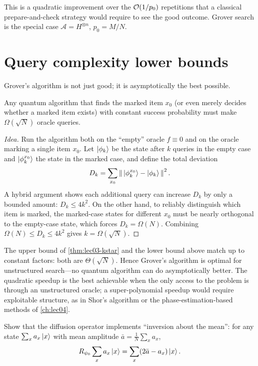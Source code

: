 This is a quadratic improvement over the $\mathcal{O}(1/p_0)$ repetitions that a
classical prepare-and-check strategy would require to see the good outcome. Grover
search is the special case $\mathcal A=H^{\otimes n}$, $p_0=M/N$.

\section{Query complexity lower bounds}
\label{sec:lec03-5}

Grover's algorithm is not just good; it is asymptotically the best possible.

\begin{theorem}
\label{thm:lec03-lower}
Any quantum algorithm that finds the marked item $x_0$ (or even merely decides
whether a marked item exists) with constant success probability must make
$\Omega(\sqrt N)$ oracle queries.
\end{theorem}

\begin{proof}[Idea]
Run the algorithm both on the ``empty'' oracle $f\equiv0$ and on the oracle
marking a single item $x_0$. Let $\ket{\phi_k}$ be the state after $k$ queries in
the empty case and $\ket{\phi_k^{x_0}}$ the state in the marked case, and define
the total deviation
\[
  D_k=\sum_{x_0}\left\lVert \,\ket{\phi_k^{x_0}}-\ket{\phi_k}\, \right\rVert^{2}.
\]
A hybrid argument shows each additional query can increase $D_k$ by only a bounded
amount: $D_k\le 4k^{2}$. On the other hand, to reliably distinguish which item is
marked, the marked-case states for different $x_0$ must be nearly orthogonal to
the empty-case state, which forces $D_k=\Omega(N)$. Combining
$\Omega(N)\le D_k\le 4k^{2}$ gives $k=\Omega(\sqrt N)$.
\end{proof}

\begin{remark}
\label{rem:lec03-optimal}
The upper bound of \cref{thm:lec03-kstar} and the lower bound above match up to
constant factors: both are $\Theta(\sqrt N)$. Hence Grover's algorithm is optimal
for unstructured search---no quantum algorithm can do asymptotically better. The
quadratic speedup is the best achievable when the only access to the problem is
through an unstructured oracle; a super-polynomial speedup would require
exploitable structure, as in Shor's algorithm or the phase-estimation-based
methods of \cref{ch:lec04}.
\end{remark}

\exercisesection
\begin{exercise}\label{ex:lec03-1}
Show that the diffusion operator implements ``inversion about the mean'': for any
state $\sum_x a_x\ket{x}$ with mean amplitude $\bar a=\tfrac1N\sum_x a_x$,
\[
  R_{\psi_0}\sum_x a_x\ket{x}=\sum_x(2\bar a-a_x)\ket{x}.
\]
\end{exercise}

